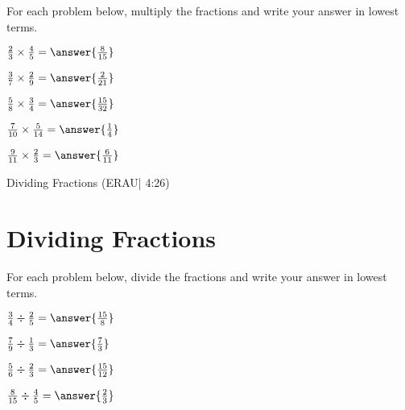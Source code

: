 \documentclass{ximera}
\begin{document}
For each problem below, multiply the fractions and write your answer in lowest terms.

\begin{problem}
$\frac{2}{3} \times \frac{4}{5} = \answer{\frac{8}{15}}$
\end{problem}

\begin{problem}
$\frac{3}{7} \times \frac{2}{9} = \answer{\frac{2}{21}}$
\end{problem}

\begin{problem}
$\frac{5}{8} \times \frac{3}{4} = \answer{\frac{15}{32}}$
\end{problem}

\begin{problem}
$\frac{7}{10} \times \frac{5}{14} = \answer{\frac{1}{4}}$
\end{problem}

\begin{problem}
$\frac{9}{11} \times \frac{2}{3} = \answer{\frac{6}{11}}$
\end{problem}


Dividing Fractions (ERAU| 4:26)



\section*{Dividing Fractions}

For each problem below, divide the fractions and write your answer in lowest terms.

\begin{problem}
$\frac{3}{4} \div \frac{2}{5} = \answer{\frac{15}{8}}$
\end{problem}

\begin{problem}
$\frac{7}{9} \div \frac{1}{3} = \answer{\frac{7}{3}}$
\end{problem}

\begin{problem}
$\frac{5}{6} \div \frac{2}{3} = \answer{\frac{15}{12}}$
\end{problem}

\begin{problem}
$\frac{8}{15} \div \frac{4}{5} = \answer{\frac{2}{3}}$
\end{problem}
\end{document}
